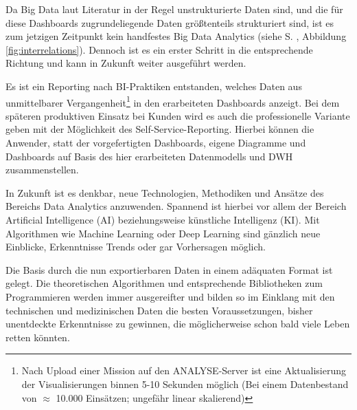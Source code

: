 Da Big Data laut Literatur \cite{Fischer.2014, Hausler.2018} in der Regel unstrukturierte Daten sind, und die für diese Dashboards zugrundeliegende Daten größtenteils strukturiert sind, ist es zum jetzigen Zeitpunkt kein handfestes \glqq Big Data Analytics\grqq{} (siehe  S. \pageref{fig:interrelations}, Abbildung \ref{fig:interrelations}).
Dennoch ist es ein erster Schritt in die entsprechende Richtung und kann in Zukunft weiter ausgeführt werden.

Es ist ein Reporting nach \gls{BI}-Praktiken entstanden, welches Daten aus unmittelbarer Vergangenheit\footnote{Nach Upload einer Mission auf den \gls{ANALYSE}-Server ist eine Aktualisierung der Visualisierungen binnen 5-10 Sekunden möglich (Bei einem Datenbestand von $\approx$ 10.000 Einsätzen; ungefähr linear skalierend)} in den erarbeiteten Dashboards anzeigt.
Bei dem späteren produktiven Einsatz bei Kunden wird es auch die professionelle Variante geben mit der Möglichkeit des Self-Service-Reporting.
Hierbei können die Anwender, statt der vorgefertigten Dashboards, eigene Diagramme und Dashboards auf Basis des hier erarbeiteten Datenmodells und \gls{DWH} zusammenstellen.

In Zukunft ist es denkbar, neue Technologien, Methodiken und Ansätze des Bereichs \glqq Data Analytics\grqq{} anzuwenden.
Spannend ist hierbei vor allem der Bereich \glqq Artificial Intelligence\grqq{} (AI) beziehungsweise künstliche Intelligenz (KI).
Mit Algorithmen wie \glqq Machine Learning\grqq{} oder \glqq Deep Learning\grqq{} sind gänzlich neue Einblicke, Erkenntnisse Trends oder gar Vorhersagen möglich.

Die Basis durch die nun exportierbaren Daten in einem adäquaten Format ist gelegt.
Die theoretischen Algorithmen und entsprechende Bibliotheken zum Programmieren werden immer ausgereifter und bilden so im Einklang mit den technischen und medizinischen Daten die besten Voraussetzungen, bisher unentdeckte Erkenntnisse zu gewinnen, die möglicherweise schon bald viele Leben retten könnten.


